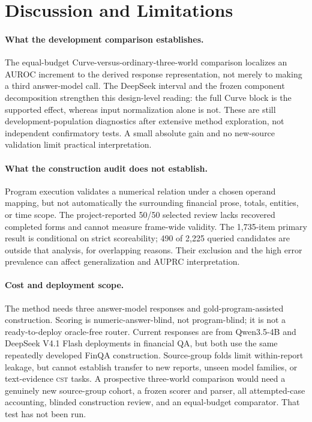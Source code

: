 \documentclass[11pt]{article}
\newcommand{\CST}{\textsc{cst}}
\begin{document}
\section{Discussion and Limitations}
\paragraph{What the development comparison establishes.}
The equal-budget Curve-versus-ordinary-three-world comparison localizes an AUROC increment to the derived response representation, not merely to making a third answer-model call. The DeepSeek interval and the frozen component decomposition strengthen this design-level reading: the full Curve block is the supported effect, whereas input normalization alone is not. These are still development-population diagnostics after extensive method exploration, not independent confirmatory tests. A small absolute gain and no new-source validation limit practical interpretation.

\paragraph{What the construction audit does not establish.}
Program execution validates a numerical relation under a chosen operand mapping, but not automatically the surrounding financial prose, totals, entities, or time scope. The project-reported 50/50 selected review lacks recovered completed forms and cannot measure frame-wide validity. The 1,735-item primary result is conditional on strict scoreability; 490 of 2,225 queried candidates are outside that analysis, for overlapping reasons. Their exclusion and the high error prevalence can affect generalization and AUPRC interpretation.

\paragraph{Cost and deployment scope.}
The method needs three answer-model responses and gold-program-assisted construction. Scoring is numeric-answer-blind, not program-blind; it is not a ready-to-deploy oracle-free router. Current responses are from Qwen3.5-4B and DeepSeek V4.1 Flash deployments in financial QA, but both use the same repeatedly developed FinQA construction. Source-group folds limit within-report leakage, but cannot establish transfer to new reports, unseen model families, or text-evidence \CST{} tasks. A prospective three-world comparison would need a genuinely new source-group cohort, a frozen scorer and parser, all attempted-case accounting, blinded construction review, and an equal-budget comparator. That test has not been run.
\end{document}
